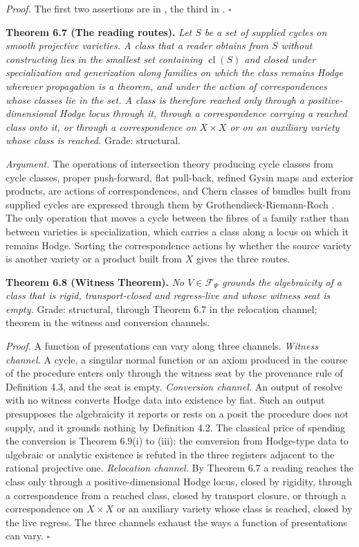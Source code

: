 \documentclass[10pt,twocolumn]{article}
\begin{document}
\emph{Proof.} The first two assertions are in \cite{kleiman1968}, the
third in \cite{andre1996}. \(\square\)

\textbf{Theorem 6.7 (The reading routes).} \emph{Let \(S\) be a set of
supplied cycles on smooth projective varieties. A class that a reader
obtains from \(S\) without constructing lies in the smallest set
containing \(\operatorname{cl}(S)\) and closed under specialization and
generization along families on which the class remains Hodge wherever
propagation is a theorem, and under the action of correspondences whose
classes lie in the set. A class is therefore reached only through a
positive-dimensional Hodge locus through it, through a correspondence
carrying a reached class onto it, or through a correspondence on
\(X\times X\) or on an auxiliary variety whose class is reached.} Grade:
structural.

\emph{Argument.} The operations of intersection theory producing cycle
classes from cycle classes, proper push-forward, flat pull-back, refined
Gysin maps and exterior products, are actions of correspondences, and
Chern classes of bundles built from supplied cycles are expressed
through them by Grothendieck-Riemann-Roch \cite{fulton1998}. The only
operation that moves a cycle between the fibres of a family rather than
between varieties is specialization, which carries a class along a locus
on which it remains Hodge. Sorting the correspondence actions by whether
the source variety is another variety or a product built from \(X\)
gives the three routes.

\textbf{Theorem 6.8 (Witness Theorem).} \emph{No
\(V\in\mathcal{F}_\Psi\) grounds the algebraicity of a class that is
rigid, transport-closed and regress-live and whose witness seat is
empty.} Grade: structural, through Theorem 6.7 in the relocation
channel; theorem in the witness and conversion channels.

\emph{Proof.} A function of presentations can vary along three channels.
\emph{Witness channel.} A cycle, a singular normal function or an axiom
produced in the course of the procedure enters only through the witness
seat by the provenance rule of Definition 4.3, and the seat is empty.
\emph{Conversion channel.} An output of resolve with no witness converts
Hodge data into existence by fiat. Such an output presupposes the
algebraicity it reports or rests on a posit the procedure does not
supply, and it grounds nothing by Definition 4.2. The classical price of
spending the conversion is Theorem 6.9(i) to (iii): the conversion from
Hodge-type data to algebraic or analytic existence is refuted in the
three registers adjacent to the rational projective one.
\emph{Relocation channel.} By Theorem 6.7 a reading reaches the class
only through a positive-dimensional Hodge locus, closed by rigidity,
through a correspondence from a reached class, closed by transport
closure, or through a correspondence on \(X\times X\) or an auxiliary
variety whose class is reached, closed by the live regress. The three
channels exhaust the ways a function of presentations can vary.
\(\square\)
\end{document}
